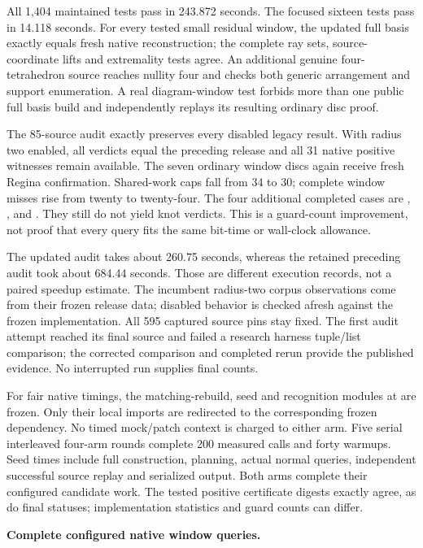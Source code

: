 All 1,404 maintained tests pass in 243.872 seconds. The focused sixteen
tests pass in 14.118 seconds. For every tested small residual window,
the updated full basis exactly equals fresh native reconstruction; the
complete ray sets, source-coordinate lifts and extremality tests agree.
An additional genuine four-tetrahedron source reaches nullity four and
checks both generic arrangement and support enumeration. A real
diagram-window test forbids more than one public full basis build and
independently replays its resulting ordinary disc proof.

The 85-source audit exactly preserves every disabled legacy result.
With radius two enabled, all verdicts equal the preceding release and
all 31 native positive witnesses remain available. The seven ordinary
window discs again receive fresh Regina confirmation. Shared-work caps
fall from 34 to 30; complete window misses rise from twenty to twenty-four.
The four additional completed cases are , ,
 and . They still do not yield knot
verdicts. This is a guard-count improvement, not proof that every query
fits the same bit-time or wall-clock allowance.

The updated audit takes about 260.75 seconds, whereas the retained preceding
audit took about 684.44 seconds. Those are different execution records,
not a paired speedup estimate. The incumbent radius-two corpus observations
come from their frozen release data; disabled behavior is checked afresh
against the frozen implementation. All 595 captured source pins stay fixed.
The first audit attempt reached its final source and failed a research
harness tuple/list comparison; the corrected comparison and completed rerun
provide the published evidence. No interrupted run supplies final counts.

For fair native timings, the matching-rebuild, seed and recognition modules
at  are frozen. Only their local imports are redirected
to the corresponding frozen dependency. No timed mock/patch context is
charged to either arm. Five serial interleaved four-arm rounds complete
200 measured calls and forty warmups. Seed times include full construction,
planning, actual normal queries, independent successful source replay and
serialized output. Both arms complete their configured candidate work.
The tested positive certificate digests exactly agree, as do final statuses;
implementation statistics and guard counts can differ.

\begin{samepage}
\noindent\textbf{Complete configured native window queries.}

\end{samepage}

